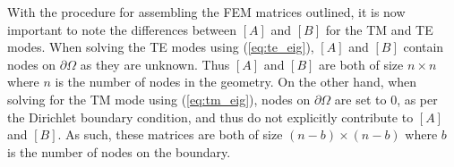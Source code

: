 With the procedure for assembling the FEM matrices outlined, it is now important to note the differences between $[A]$ and $[B]$ for the TM and TE modes. When solving the TE modes using (\ref{eq:te_eig}), $[A]$ and $[B]$ contain nodes on $\partial\Omega$ as they are unknown. Thus $[A]$ and $[B]$ are both of size $n\times n$ where $n$ is the number of nodes in the geometry. On the other hand, when solving for the TM mode using (\ref{eq:tm_eig}), nodes on $\partial\Omega$ are set to $0$, as per the Dirichlet boundary condition, and thus do not explicitly contribute to $[A]$ and $[B]$. As such, these matrices are both of size $(n-b)\times(n-b)$ where $b$ is the number of nodes on the boundary.